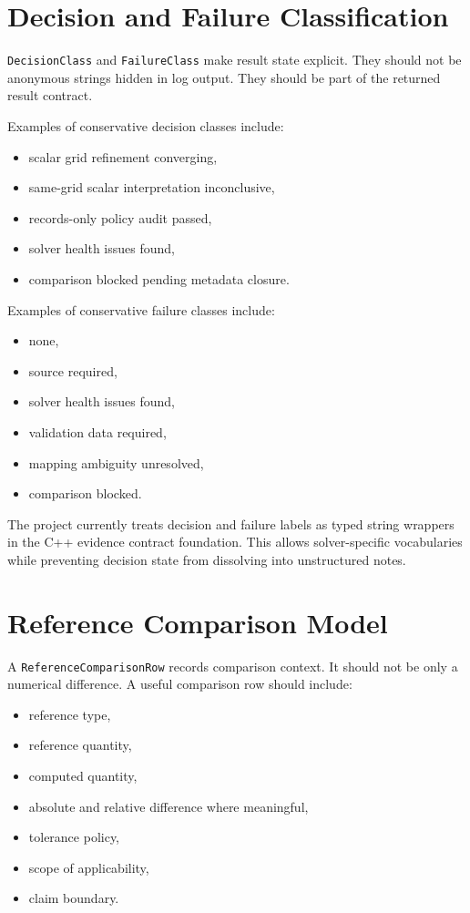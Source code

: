 \documentclass[11pt,a4paper]{article}
\newcommand{\code}[1]{\texttt{#1}}
\begin{document}
\section{Decision and Failure Classification}
\label{sec:decision-and-failure-classification}

\code{DecisionClass} and \code{FailureClass} make result state explicit. They should not be anonymous strings hidden in log output. They should be part of the returned result contract.

Examples of conservative decision classes include:

\begin{itemize}
  \item scalar grid refinement converging,
  \item same-grid scalar interpretation inconclusive,
  \item records-only policy audit passed,
  \item solver health issues found,
  \item comparison blocked pending metadata closure.
\end{itemize}

Examples of conservative failure classes include:

\begin{itemize}
  \item none,
  \item source required,
  \item solver health issues found,
  \item validation data required,
  \item mapping ambiguity unresolved,
  \item comparison blocked.
\end{itemize}

The project currently treats decision and failure labels as typed string wrappers in the C++ evidence contract foundation. This allows solver-specific vocabularies while preventing decision state from dissolving into unstructured notes.

\section{Reference Comparison Model}
\label{sec:reference-comparison-model}

A \code{ReferenceComparisonRow} records comparison context. It should not be only a numerical difference. A useful comparison row should include:

\begin{itemize}
  \item reference type,
  \item reference quantity,
  \item computed quantity,
  \item absolute and relative difference where meaningful,
  \item tolerance policy,
  \item scope of applicability,
  \item claim boundary.
\end{itemize}
\end{document}
